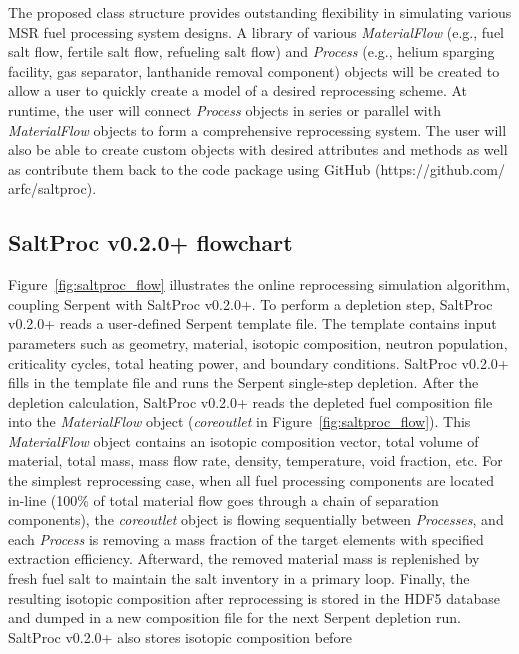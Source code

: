 \documentclass[12pt]{article} %
\begin{document}
The proposed class structure provides outstanding flexibility in simulating 
various \gls{MSR} fuel processing system designs. A library of various 
\textit{MaterialFlow} (e.g., fuel salt flow, fertile salt flow, refueling salt 
flow) and \textit{Process} (e.g., helium sparging facility, gas separator, 
lanthanide removal component) objects will be created to allow a user to 
quickly create a model of a desired reprocessing scheme. At runtime, the user 
will connect \textit{Process} objects in series or parallel with 
\textit{MaterialFlow} objects to form a comprehensive reprocessing system. The 
user will also be able to create custom objects with desired attributes and 
methods as well as contribute them back to the code package using GitHub 
(https://github.com/ arfc/saltproc).	

\subsection{SaltProc v0.2.0+ flowchart}
Figure~\ref{fig:saltproc_flow} illustrates the online reprocessing simulation 
algorithm, coupling Serpent with SaltProc v0.2.0+. To perform a depletion step, 
SaltProc v0.2.0+ reads a user-defined Serpent template file. The template  
contains input parameters such as geometry, material, isotopic composition, 
neutron population, criticality cycles, total heating power, and boundary 
conditions. SaltProc v0.2.0+ fills in the template file and runs the Serpent 
single-step depletion. After the depletion calculation, SaltProc v0.2.0+ reads 
the depleted fuel composition file into the \textit{MaterialFlow} object 
(\textit{core\textunderscore outlet} in Figure~\ref{fig:saltproc_flow}). This 
\textit{MaterialFlow} object contains an isotopic composition vector, total 
volume of material, total mass, mass flow rate, density, temperature, void 
fraction, etc. For the simplest reprocessing case, when all fuel processing 
components are located in-line (100\% of total material flow goes through 
a chain of separation components), the \textit{core\textunderscore outlet} 
object is flowing sequentially between \textit{Processes}, and each 
\textit{Process} is removing a mass fraction of the target elements with 
specified extraction efficiency. Afterward, the removed material mass is 
replenished by fresh fuel salt to maintain the salt inventory in a primary 
loop. Finally, the resulting isotopic composition after reprocessing is stored 
in the HDF5 database and dumped in a new composition file for the next 
Serpent depletion run. SaltProc v0.2.0+ also stores isotopic composition before 
\end{document}
